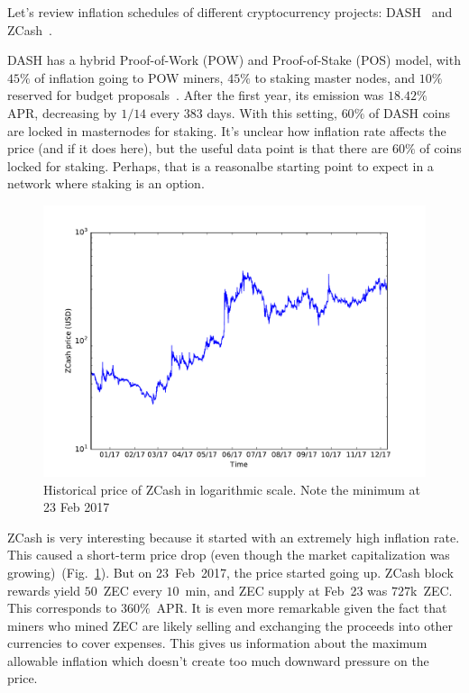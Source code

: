 \documentclass[longbibliography,nofootinbib,twocolumn]{revtex4-1}
\newcommand{\figref}[1]{Fig.~\ref{#1}}
\begin{document}
Let's review inflation schedules of different cryptocurrency projects:
DASH~\cite{dash:whitepaper} and ZCash~\cite{zcash}.

DASH has a hybrid Proof-of-Work (POW) and Proof-of-Stake (POS) model,
with $45\%$ of inflation going to POW miners, $45\%$ to staking master nodes, and $10\%$ reserved for budget proposals~\cite{dash:emission}.
After the first year, its emission was $18.42\%$ APR, decreasing by $1/14$ every $383$ days.
With this setting, $60\%$ of DASH coins are locked in masternodes for staking.
It's unclear how inflation rate affects the price (and if it does here), but the useful data point is that there are $60\%$ of coins locked for staking.
Perhaps, that is a reasonalbe starting point to expect in a network where staking is an option.

\begin{figure}
    \includegraphics[width=\columnwidth]{pdf/zcash-price.pdf}
    \caption{Historical price of ZCash in logarithmic scale. Note the minimum at 23 Feb 2017}
    \label{fig:zec}
\end{figure}

ZCash is very interesting because it started with an extremely high inflation rate.
This caused a short-term price drop (even though the market capitalization was growing)~(\figref{fig:zec}).
But on 23~Feb~2017, the price started going up.
ZCash block rewards yield $50$~ZEC every $10$~min, and ZEC supply at Feb~23 was $727$k~ZEC.
This corresponds to $360\%$~APR.
It is even more remarkable given the fact that miners who mined ZEC are likely selling and exchanging the proceeds into other currencies to cover expenses.
This gives us information about the maximum allowable inflation which doesn't create too much downward pressure on the price.
\end{document}
